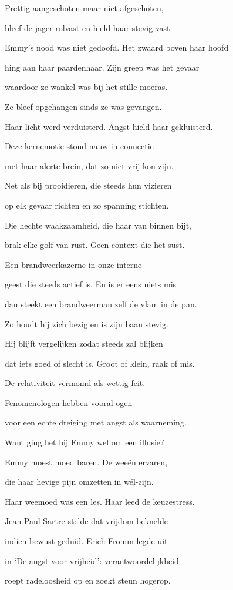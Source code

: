 Prettig aangeschoten
maar niet afgeschoten,

bleef de jager rolvast
en hield haar stevig vast.

Emmy’s nood was niet gedoofd.
Het zwaard boven haar hoofd

hing aan haar paardenhaar.
Zijn greep was het gevaar

waardoor ze wankel was
bij het stille moeras.

Ze bleef opgehangen
sinds ze was gevangen.

Haar licht werd verduisterd.
Angst hield haar gekluisterd.

Deze kernemotie
stond nauw in connectie

met haar alerte brein,
dat zo niet vrij kon zijn.

Net als bij prooidieren,
die steeds hun vizieren

op elk gevaar richten
en zo spanning stichten.

Die hechte waakzaamheid,
die haar van binnen bijt,

brak elke golf van rust.
Geen context die het sust.

Een brandweerkazerne
in onze interne

geest die steeds actief is.
En is er eens niets mis

dan steekt een brandweerman
zelf de vlam in de pan.

Zo houdt hij zich bezig
en is zijn baan stevig.

Hij blijft vergelijken
zodat steeds zal blijken

dat iets goed of slecht is.
Groot of klein, raak of mis.

De relativiteit
vermomd als wettig feit.

Fenomenologen
hebben vooral ogen

voor een echte dreiging
met angst als waarneming.

Want ging het bij Emmy
wel om een illusie?

Emmy moest moed baren.
De weeën ervaren,

die haar hevige pijn
omzetten in wél-zijn.

Haar weemoed was een les.
Haar leed de keuzestress.

Jean-Paul Sartre stelde
dat vrijdom beknelde

indien bewust geduid.
Erich Fromm legde uit

in ‘De angst voor vrijheid’:
verantwoordelijkheid

roept radeloosheid op
en zoekt steun hogerop.

